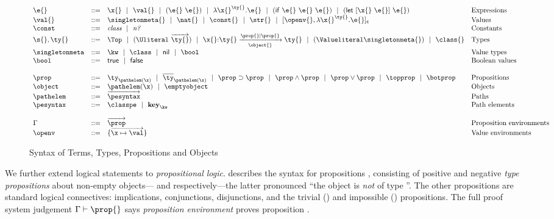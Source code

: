 \begin{figure}[t!]
$$
\begin{array}{lrll}
  \e{} &::=& \x{}
                      \alt \val{} 
                      \alt {\comb {\e{}} {\e{}}} 
                      \alt {\abs {\x{}} {\ty{}} {\e{}}} 
                      \alt {\ifexp {\e{}} {\e{}} {\e{}}}
                      \alt {\letexp {\x{}} {\e{}} {\e{}}}
                      &\mbox{Expressions} \\
  \val{} &::=&          \singletonmeta{}
                      \alt {\nat{}}
                      \alt {\const{}}
                      \alt {\str{}}
                      \alt {\closure {\openv{}} {\abs {\x{}} {\ty{}} {\e{}}}}
                &\mbox{Values} \\
                \constantssyntax{}\\
  \s{}, \ty{}    &::=& \Top 
                      \alt {\Unionsplice {\overrightarrow{\ty{}}}}
                      \alt
                      {\ArrowOne {\x{}} {\ty{}}
                                   {\ty{}}
                                   {\filterset {\prop{}} {\prop{}}}
                                   {\object{}}}
                      \alt {\Value \singletonmeta{}} 
                      \alt \trdiff{\class{}}
                &\mbox{Types} \\
  \singletonallsyntax{}
                \\ \\
  \occurrencetypingsyntax{}\\
  \propenvsyntax{}\\
  \openvsyntax{}
\end{array}
$$
\caption{Syntax of Terms, Types, Propositions and Objects}
\label{main:figure:termsyntax}
\end{figure}

We further extend logical statements to \emph{propositional logic}.
 describes the syntax
for propositions \prop{},
consisting of positive and negative \emph{type propositions} 
about non-empty objects---{\isprop {\ty{}} {\pth {\pathelem{}} {\x{}}}}
and {\notprop {\ty{}} {\pth {\pathelem{}} {\x{}}}}
respectively---the latter pronounced ``the object {\pth {\pathelem{}} {\x{}}} is \emph{not} of type \ty{}''.
The other propositions are standard logical connectives: implications, conjunctions,
disjunctions, and the trivial (\topprop{}) and impossible (\botprop{}) propositions.
%
The full proof system judgement
$
{ \inpropenv {\propenv{}} {\prop{}} }
$
says \emph{proposition environment} {\propenv{}} proves proposition \prop{}.

